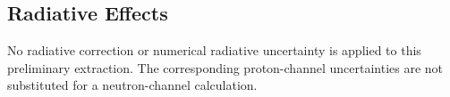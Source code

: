 \subsection{Radiative Effects}
No radiative correction or numerical radiative uncertainty is applied to this preliminary extraction. The corresponding proton-channel uncertainties are not substituted for a neutron-channel calculation.
